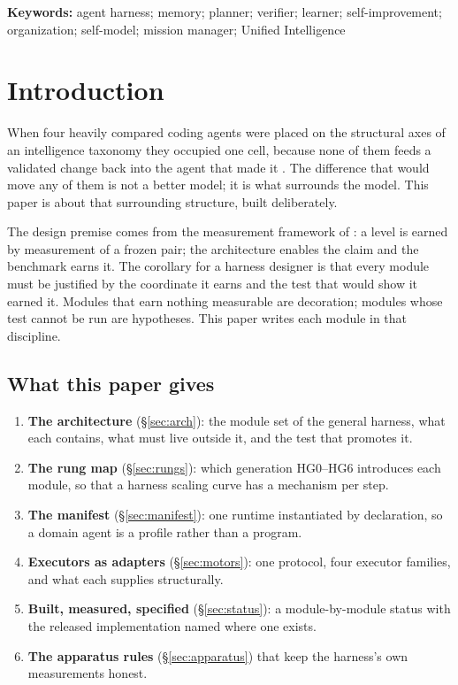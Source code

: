 \noindent\textbf{Keywords:} agent harness; memory; planner; verifier; learner; self-improvement; organization; self-model; mission manager; Unified Intelligence

\tableofcontents
\bigskip

\section{Introduction}\label{sec:intro}

When four heavily compared coding agents were placed on the structural axes of an intelligence taxonomy they occupied one cell, because none of them feeds a validated change back into the agent that made it \citep{yang2026capability}. The difference that would move any of them is not a better model; it is what surrounds the model. This paper is about that surrounding structure, built deliberately.

The design premise comes from the measurement framework of \citet{yang2026unified}: a level is earned by measurement of a frozen pair; the architecture enables the claim and the benchmark earns it. The corollary for a harness designer is that every module must be justified by the coordinate it earns and the test that would show it earned it. Modules that earn nothing measurable are decoration; modules whose test cannot be run are hypotheses. This paper writes each module in that discipline.

\subsection{What this paper gives}

\begin{enumerate}[leftmargin=*]
\item \textbf{The architecture} (\S\ref{sec:arch}): the module set of the general harness, what each contains, what must live outside it, and the test that promotes it.
\item \textbf{The rung map} (\S\ref{sec:rungs}): which generation HG0--HG6 introduces each module, so that a harness scaling curve has a mechanism per step.
\item \textbf{The manifest} (\S\ref{sec:manifest}): one runtime instantiated by declaration, so a domain agent is a profile rather than a program.
\item \textbf{Executors as adapters} (\S\ref{sec:motors}): one protocol, four executor families, and what each supplies structurally.
\item \textbf{Built, measured, specified} (\S\ref{sec:status}): a module-by-module status with the released implementation named where one exists.
\item \textbf{The apparatus rules} (\S\ref{sec:apparatus}) that keep the harness's own measurements honest.
\end{enumerate}

